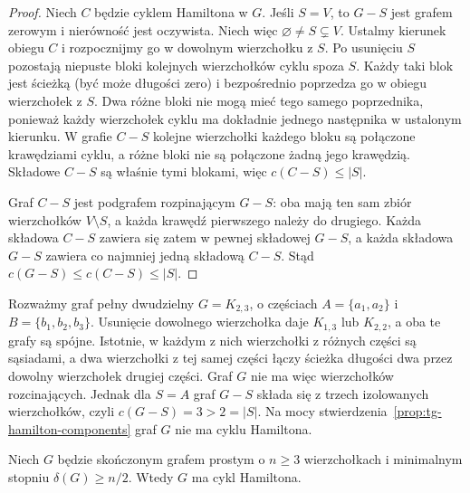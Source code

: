 \begin{proof}
Niech $C$ będzie cyklem Hamiltona w $G$.
Jeśli $S=V$, to $G-S$ jest grafem zerowym
i nierówność jest oczywista. Niech więc
$\varnothing\ne S\subsetneq V$.
Ustalmy kierunek obiegu $C$ i rozpocznijmy go
w dowolnym wierzchołku z $S$. Po usunięciu $S$
pozostają niepuste bloki kolejnych wierzchołków
cyklu spoza $S$. Każdy taki blok jest ścieżką
(być może długości zero) i bezpośrednio poprzedza
go w obiegu wierzchołek z $S$. Dwa różne bloki
nie mogą mieć tego samego poprzednika, ponieważ
każdy wierzchołek cyklu ma dokładnie jednego
następnika w ustalonym kierunku. W grafie $C-S$
kolejne wierzchołki każdego bloku są połączone
krawędziami cyklu, a różne bloki nie są połączone
żadną jego krawędzią. Składowe $C-S$ są właśnie
tymi blokami, więc
$c(C-S)\le |S|$.

Graf $C-S$ jest podgrafem rozpinającym $G-S$:
oba mają ten sam zbiór wierzchołków $V\setminus S$,
a każda krawędź pierwszego należy do drugiego.
Każda składowa $C-S$ zawiera się zatem w pewnej
składowej $G-S$, a każda składowa $G-S$ zawiera
co najmniej jedną składową $C-S$.
Stąd $c(G-S)\le c(C-S)\le |S|$.
\end{proof}

\begin{przyklad}
Rozważmy graf pełny dwudzielny $G=K_{2,3}$,
o częściach $A=\{a_1,a_2\}$ i $B=\{b_1,b_2,b_3\}$.
Usunięcie dowolnego wierzchołka daje $K_{1,3}$
lub $K_{2,2}$, a oba te grafy są spójne.
Istotnie, w każdym z nich wierzchołki z różnych
części są sąsiadami, a dwa wierzchołki z tej samej
części łączy ścieżka długości dwa przez dowolny
wierzchołek drugiej części. Graf $G$ nie ma więc
wierzchołków rozcinających.
Jednak dla $S=A$ graf $G-S$ składa się z trzech
izolowanych wierzchołków, czyli
$c(G-S)=3>2=|S|$.
Na mocy stwierdzenia~\ref{prop:tg-hamilton-components}
graf $G$ nie ma cyklu Hamiltona.
\end{przyklad}

\begin{twierdzenie}[Dirac]
\label{thm:tg-dirac}
Niech $G$ będzie skończonym grafem prostym o
$n\ge3$ wierzchołkach i minimalnym stopniu
$\delta(G)\ge n/2$. Wtedy $G$ ma cykl Hamiltona.
\end{twierdzenie}

